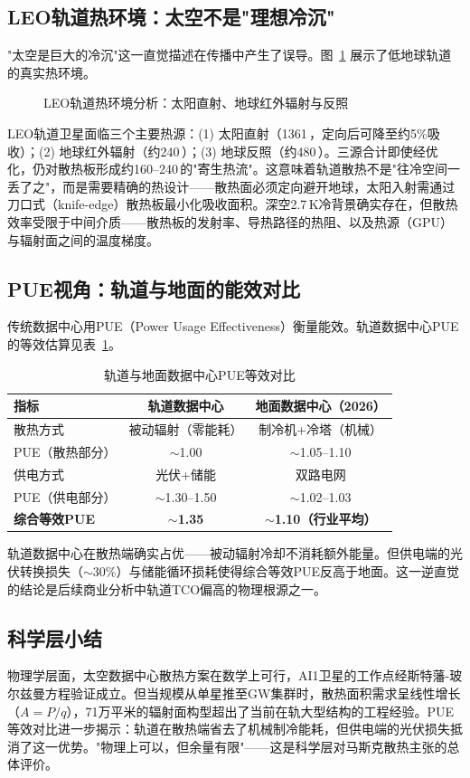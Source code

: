\subsection{LEO轨道热环境：太空不是"理想冷沉"}

"太空是巨大的冷沉"这一直觉描述在传播中产生了误导。图~\ref{fig:leo_thermal} 展示了低地球轨道的真实热环境。

\begin{figure}[H]
\centering

\caption{LEO轨道热环境分析：太阳直射、地球红外辐射与反照}
\label{fig:leo_thermal}
\end{figure}

LEO轨道卫星面临三个主要热源：(1) 太阳直射（1361\,\unitWpm{}，定向后可降至约5\%吸收）；(2) 地球红外辐射（约240\,\unitWpm{}）；(3) 地球反照（约480\,\unitWpm{}）。三源合计即使经优化，仍对散热板形成约160--240\,\unitWpm{}的"寄生热流"。这意味着轨道散热不是"往冷空间一丢了之"，而是需要精确的热设计——散热面必须定向避开地球，太阳入射需通过刀口式（knife-edge）散热板最小化吸收面积。深空2.7\,K冷背景确实存在，但散热效率受限于中间介质——散热板的发射率、导热路径的热阻、以及热源（GPU）与辐射面之间的温度梯度。

\subsection{PUE视角：轨道与地面的能效对比}

传统数据中心用PUE（Power Usage Effectiveness）衡量能效。轨道数据中心PUE的等效估算见表~\ref{tab:pue}。

\begin{table}[H]
\centering
\footnotesize
\caption{轨道与地面数据中心PUE等效对比}
\label{tab:pue}
\begin{tabular}{lcc}
\toprule
\textbf{指标} & \textbf{轨道数据中心} & \textbf{地面数据中心（2026）} \\
\midrule
散热方式 & 被动辐射（零能耗） & 制冷机+冷塔（机械） \\
PUE（散热部分） & $\sim$1.00 & $\sim$1.05--1.10 \\
\addlinespace
供电方式 & 光伏+储能 & 双路电网 \\
PUE（供电部分） & $\sim$1.30--1.50 & $\sim$1.02--1.03 \\
\addlinespace
\textbf{综合等效PUE} & $\sim$\textbf{1.35} & $\sim$\textbf{1.10（行业平均）} \\
\bottomrule
\end{tabular}
\end{table}

轨道数据中心在散热端确实占优——被动辐射冷却不消耗额外能量。但供电端的光伏转换损失（$\sim$30\%）与储能循环损耗使得综合等效PUE反高于地面。这一逆直觉的结论是后续商业分析中轨道TCO偏高的物理根源之一。

\subsection{科学层小结}

物理学层面，太空数据中心散热方案在数学上可行，AI1卫星的工作点经斯特藩-玻尔兹曼方程验证成立。但当规模从单星推至GW集群时，散热面积需求呈线性增长（$A = P/q$），71万平米的辐射面构型超出了当前在轨大型结构的工程经验。PUE等效对比进一步揭示：轨道在散热端省去了机械制冷能耗，但供电端的光伏损失抵消了这一优势。"物理上可以，但余量有限"——这是科学层对马斯克散热主张的总体评价。
